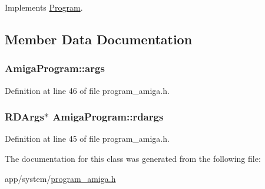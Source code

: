 Implements \hyperlink{classProgram_a466c115e35933f7fb3a3775bc8f20ac4}{Program}.



\subsection{Member Data Documentation}
\subsubsection[{\texorpdfstring{args}{args}}]{ Amiga\+Program\+::args\hspace{0.3cm}{\ttfamily [private]}}\hypertarget{classAmigaProgram_acd5b7654dff28b38f6d8e66ddb1dcff7}{}\label{classAmigaProgram_acd5b7654dff28b38f6d8e66ddb1dcff7}


Definition at line 46 of file program\+\_\+amiga.\+h.

\subsubsection[{\texorpdfstring{rdargs}{rdargs}}]{\setlength{\rightskip}{0pt plus 5cm}R\+D\+Args$\ast$ Amiga\+Program\+::rdargs\hspace{0.3cm}{\ttfamily [private]}}\hypertarget{classAmigaProgram_a34bbca2534a063c7020487c9138f0534}{}\label{classAmigaProgram_a34bbca2534a063c7020487c9138f0534}


Definition at line 45 of file program\+\_\+amiga.\+h.



The documentation for this class was generated from the following file\+:\begin{DoxyCompactItemize}
\item 
app/system/\hyperlink{program__amiga_8h}{program\+\_\+amiga.\+h}\end{DoxyCompactItemize}
